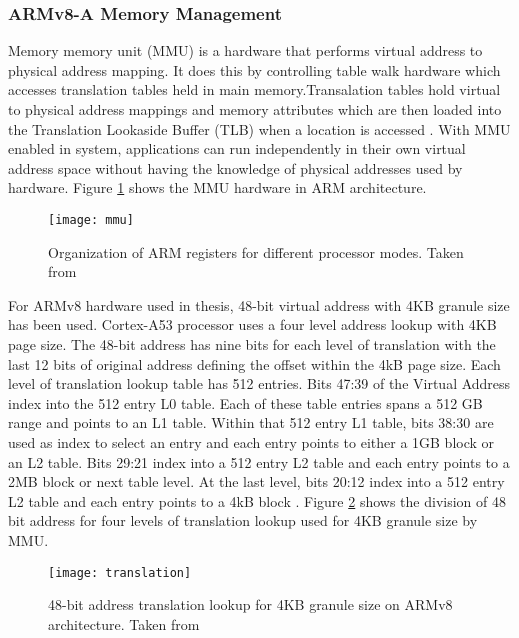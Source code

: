 \subsubsection{ARMv8-A Memory Management\label{sec:armv8_mem}}
Memory memory unit (MMU) is a hardware that performs virtual address to physical address mapping. It does this by controlling table walk hardware which accesses translation tables held in main memory.Transalation tables hold virtual to physical address mappings and memory attributes which are then loaded into the Translation Lookaside Buffer (TLB) when a location is accessed \cite{cortexA53}.
With MMU enabled in system, applications can run independently in their own virtual address space without having the knowledge of physical addresses used by hardware. Figure \ref{mmu} shows the MMU hardware in ARM architecture.
\begin{figure}[!htbp]
	\centering
	\texttt{[image: mmu]}
	\caption{Organization of ARM registers for different processor modes. Taken from \cite{mmu}}
	\label{mmu}
\end{figure}

For ARMv8 hardware used in thesis, 48-bit virtual address with 4KB granule size has been used. Cortex-A53 processor uses a four level address lookup with 4KB page size. The 48-bit address has nine bits for each level of translation with the last 12 bits of original address defining the offset within the 4kB page size. Each level of translation lookup table has 512 entries.
Bits 47:39 of the Virtual Address index into the 512 entry L0 table. Each of these table entries spans a 512 GB range and points to an L1 table. Within that 512 entry L1 table, bits 38:30 are used as index to select an entry and each entry points to either a 1GB block or an L2 table. Bits 29:21 index into a 512 entry L2 table and each entry points to a 2MB block or next table level. At the last level, bits 20:12 index into a 512 entry L2 table and each entry points to a 4kB block \cite{translation}. Figure \ref{translation} shows the division of 48 bit address for four levels of translation lookup used for 4KB granule size by MMU.

\begin{figure}[!htbp]
	\centering
	\texttt{[image: translation]}
	\caption{48-bit address translation lookup for 4KB granule size on ARMv8 architecture. Taken from \cite{translation}}
	\label{translation}
\end{figure}


